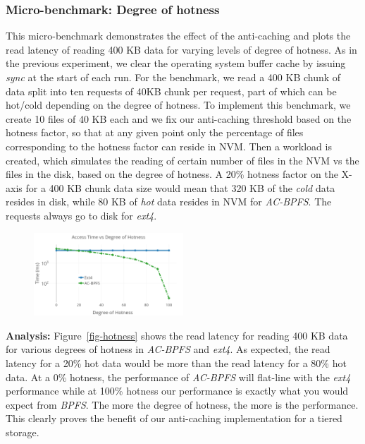 \subsubsection{Micro-benchmark: Degree of hotness}
This micro-benchmark demonstrates the effect of the anti-caching and plots the read latency of reading 400 KB data for varying levels of degree of hotness. As in the previous experiment, we clear the operating system buffer cache by issuing \textit{sync} at the start of each run. For the benchmark, we read a 400 KB chunk of data split into ten requests of 40KB chunk per request, part of which can be hot/cold depending on the degree of hotness. To implement this benchmark, we create 10 files of 40 KB each and we fix our anti-caching threshold based on the hotness factor, so that at any given point only the percentage of files corresponding to the hotness factor can reside in NVM. Then a workload is created, which simulates the reading of certain number of files in the NVM vs the files in the disk, based on the degree of hotness. A 20\% hotness factor on the X-axis for a 400 KB chunk data size would mean that 320 KB of the \textit{cold} data resides in disk, while 80 KB of \textit{hot} data resides in NVM for \textit{AC-BPFS}. The requests always go to disk for \textit{ext4}.

\begin{figure}
\centering
\includegraphics[width=0.5\textwidth]{figs/hotness.png}
\end{figure}

\textbf{Analysis:} Figure~\ref{fig-hotness} shows the read latency for reading 400 KB data for various degrees of hotness in \textit{AC-BPFS} and \textit{ext4}. As expected, the read latency for a 20\% hot data would be more than the read latency for a 80\% hot data. At a 0\% hotness, the performance of \textit{AC-BPFS} will flat-line with the \textit{ext4} performance while at 100\% hotness our performance is exactly what you would expect from \textit{BPFS}. The more the degree of hotness, the more is the performance. This clearly proves the benefit of our anti-caching implementation for a tiered storage.

